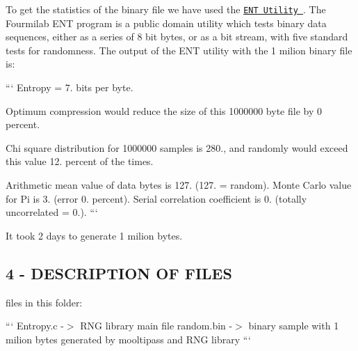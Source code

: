 To get the statistics of the binary file we have used the \href{http://www.fourmilab.ch/random/}{\tt E\+N\+T Utility }. The Fourmilab E\+N\+T program is a public domain utility which tests binary data sequences, either as a series of 8 bit bytes, or as a bit stream, with five standard tests for randomness. The output of the E\+N\+T utility with the 1 milion binary file is\+:

``` Entropy = 7. bits per byte.

Optimum compression would reduce the size of this 1000000 byte file by 0 percent.

Chi square distribution for 1000000 samples is 280., and randomly would exceed this value 12. percent of the times.

Arithmetic mean value of data bytes is 127. (127. = random). Monte Carlo value for Pi is 3. (error 0. percent). Serial correlation coefficient is 0. (totally uncorrelated = 0.). ```

It took 2 days to generate 1 milion bytes.

\subsection*{4 -\/ D\+E\+S\+C\+R\+I\+P\+T\+I\+O\+N O\+F F\+I\+L\+E\+S }


\begin{DoxyItemize}
\item files in this folder\+:
\end{DoxyItemize}

``` Entropy.\+c -\/$>$ R\+N\+G library main file random.\+bin -\/$>$ binary sample with 1 milion bytes generated by mooltipass and R\+N\+G library ``` 